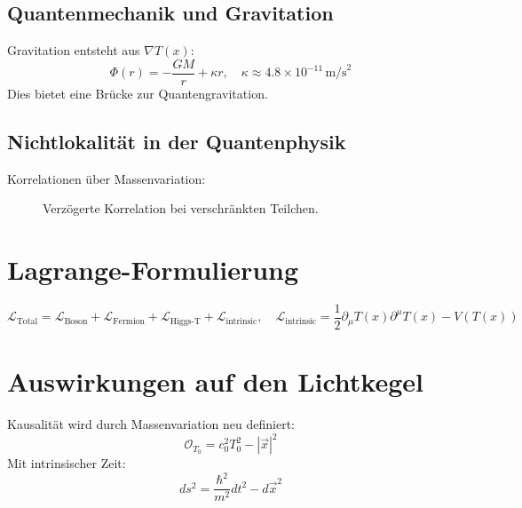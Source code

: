 \documentclass[a4paper,12pt]{article}
\newcommand{\Tfield}{T(x)}
\begin{document}
	\subsection{Quantenmechanik und Gravitation}
	Gravitation entsteht aus \( \nabla \Tfield \):
	\begin{equation}
		\Phi(r) = -\frac{GM}{r} + \kappa r, \quad \kappa \approx 4.8 \times 10^{-11} \, \text{m/s}^2
	\end{equation}
	Dies bietet eine Brücke zur Quantengravitation.
	
	\subsection{Nichtlokalität in der Quantenphysik}
	Korrelationen über Massenvariation:
	\begin{figure}[h]
		\centering
		\caption{Verzögerte Korrelation bei verschränkten Teilchen.}
	\end{figure}
	
	\section{Lagrange-Formulierung}
	\begin{equation}
		\mathcal{L}_{\text{Total}} = \mathcal{L}_{\text{Boson}} + \mathcal{L}_{\text{Fermion}} + \mathcal{L}_{\text{Higgs-T}} + \mathcal{L}_{\text{intrinsic}}, \quad \mathcal{L}_{\text{intrinsic}} = \frac{1}{2} \partial_\mu \Tfield \partial^\mu \Tfield - V(\Tfield)
	\end{equation}
	
	\section{Auswirkungen auf den Lichtkegel}
	Kausalität wird durch Massenvariation neu definiert:
	\begin{equation}
		\mathcal{O}_{T_0} = c_0^2 T_0^2 - |\vec{x}|^2
	\end{equation}
	Mit intrinsischer Zeit:
	\begin{equation}
		ds^2 = \frac{\hbar^2}{m^2} dt^2 - d\vec{x}^2
	\end{equation}
	
\end{document}
